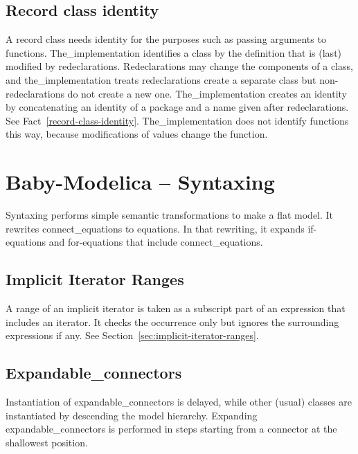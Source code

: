 \documentclass[10pt,b5paper]{article}
\begin{document}
\subsection{Record class identity}

A record class needs identity for the purposes such as passing
arguments to functions.  The_implementation identifies a class by the
definition that is (last) modified by redeclarations.  Redeclarations
may change the components of a class, and the_implementation treats
redeclarations create a separate class but non-redeclarations do not
create a new one.  The_implementation creates an identity by
concatenating an identity of a package and a name given after
redeclarations.  See Fact~\ref{record-class-identity}.
The_implementation does not identify functions this way, because
modifications of values change the function.


\section{Baby-Modelica -- Syntaxing}

{Syntaxing} performs simple semantic transformations to make a flat
model.  It rewrites connect_equations to equations.  In that
rewriting, it expands if-equations and for-equations that include
connect_equations.


\subsection{Implicit Iterator Ranges}

A range of an implicit iterator is taken as a subscript part of an
expression that includes an iterator.  It checks the occurrence only
but ignores the surrounding expressions if any.  See
Section~\ref{sec:implicit-iterator-ranges}.


\subsection{Expandable_connectors}

Instantiation of expandable_connectors is delayed, while other (usual)
classes are instantiated by descending the model hierarchy.  Expanding
expandable_connectors is performed in steps starting from a connector
at the shallowest position.
\end{document}
